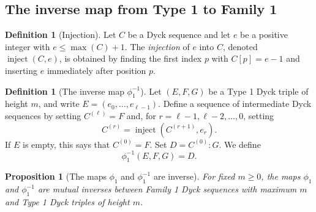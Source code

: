 \documentclass[11pt]{article}
\theoremstyle{plain}
\newtheorem{proposition}[theorem]{Proposition}
\theoremstyle{definition}
\newtheorem{definition}[theorem]{Definition}
\theoremstyle{remark}
\begin{document}
\subsection{The inverse map from Type 1 to Family 1}
\begin{definition}[Injection]
\label{def:injection}
Let \(C\) be a Dyck sequence and let \(e\) be a positive integer with
\(e\le \max(C)+1\).  The \emph{injection} of \(e\) into \(C\), denoted
\(\operatorname{inject}(C,e)\), is obtained by finding the first index \(p\)
with \(C[p]=e-1\) and inserting \(e\) immediately after position \(p\).
\end{definition}
\begin{definition}[The inverse map \(\phi_1^{-1}\)]
\label{def:phi1-inverse}
Let \((E,F,G)\) be a Type 1 Dyck triple of height \(m\), and write
\(E=(e_0,\ldots,e_{\ell-1})\).  Define a sequence of intermediate Dyck
sequences by setting \(C^{(\ell)}=F\) and, for
\(r=\ell-1,\ell-2,\ldots,0\), setting
\[
  C^{(r)}=\operatorname{inject}(C^{(r+1)},e_r).
\]
If \(E\) is empty, this says that \(C^{(0)}=F\).  Set
\(D=C^{(0)}:G\).  We define
\[
  \phi_1^{-1}(E,F,G)=D.
\]
\end{definition}
\begin{proposition}[The maps \(\phi_1\) and \(\phi_1^{-1}\) are inverse]
\label{prop:phi1-inverse}
For fixed \(m\ge 0\), the maps \(\phi_1\) and \(\phi_1^{-1}\) are mutual
inverses between Family 1 Dyck sequences with maximum \(m\) and Type 1 Dyck
triples of height \(m\).
\end{proposition}
\end{document}
